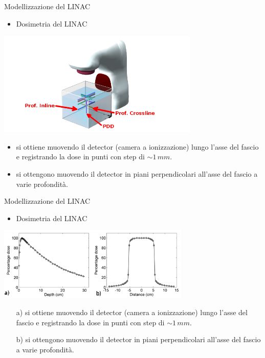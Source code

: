 \documentclass{beamer}
\begin{document}
\begin{frame}{Modellizzazione del LINAC}
\begin{itemize}
\scriptsize
{}
\item \alert{Dosimetria del LINAC}
\end{itemize}
\includegraphics[height=5cm]{./img/Prof3D_ann.png}
\begin{itemize}
\scriptsize
\item {} si ottiene muovendo il detector (camera a ionizzazione) lungo l'asse del fascio e registrando la dose in punti con step di $\sim 1\,mm$.
\item {} si ottengono muovendo il detector in piani perpendicolari all'asse del fascio a varie profondità.
\end{itemize}
\end{frame}


\begin{frame}{Modellizzazione del LINAC}
\begin{itemize}
\scriptsize
{}
\item \alert{Dosimetria del LINAC}
\end{itemize}
\vspace{.75cm}
\centering
\includegraphics[height=3.5cm]{../cap2/pdd_prof.png}\\
\vspace{.75cm}
\begin{itemize}
\scriptsize
\item[a)]  si ottiene muovendo il detector (camera a ionizzazione) lungo l'asse del fascio e registrando la dose in punti con step di $\sim 1\,mm$.
\item[b)]  si ottengono muovendo il detector in piani perpendicolari all'asse del fascio a varie profondità.
\end{itemize}
\end{frame}
\end{document}
